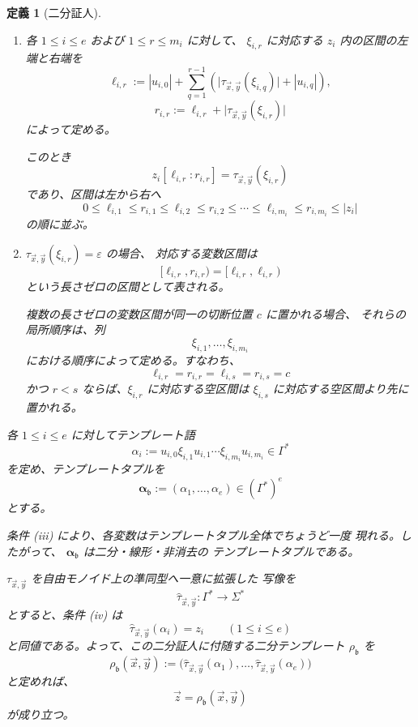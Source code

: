 \documentclass[11pt,a4paper]{ltjsarticle}
\newtheorem{definition}[theorem]{定義}
\theoremstyle{remark}
\newcommand{\tuple}[1]{\vec{#1}}
\newcommand{\eps}{\varepsilon}
\begin{document}
\begin{definition}[二分証人]
\begin{enumerate}[label=(\roman*),leftmargin=*]
各 \(1\le i\le e\) について、次の等式が成り立つ。
\[
  z_i
  =
  u_{i,0}\,
  \tau_{\tuple x,\tuple y}(\xi_{i,1})\,
  u_{i,1}\cdots
  \tau_{\tuple x,\tuple y}(\xi_{i,m_i})\,
  u_{i,m_i}.
  \tag{\(*\)}
\]
したがって、式 \textup{(\(*\))} は親成分 \(z_i\) を、終端語からなる
隙間と、子タプルの成分を値にもつ変数区間とに分解する。

\item
各 \(1\le i\le e\) および \(1\le r\le m_i\) に対して、
\(\xi_{i,r}\) に対応する \(z_i\) 内の区間の左端と右端を
\[
  \ell_{i,r}
  :=
  |u_{i,0}|
  +
  \sum_{q=1}^{r-1}
  \left(
    \bigl|
      \tau_{\tuple x,\tuple y}(\xi_{i,q})
    \bigr|
    +
    |u_{i,q}|
  \right),
\]
\[
  r_{i,r}
  :=
  \ell_{i,r}
  +
  \bigl|
    \tau_{\tuple x,\tuple y}(\xi_{i,r})
  \bigr|
\]
によって定める。

このとき
\[
  z_i[\ell_{i,r}:r_{i,r}]
  =
  \tau_{\tuple x,\tuple y}(\xi_{i,r})
\]
であり、区間は左から右へ
\[
  0\le
  \ell_{i,1}\le r_{i,1}\le
  \ell_{i,2}\le r_{i,2}\le
  \cdots\le
  \ell_{i,m_i}\le r_{i,m_i}\le |z_i|
\]
の順に並ぶ。

\item
\(\tau_{\tuple x,\tuple y}(\xi_{i,r})=\eps\) の場合、
対応する変数区間は
\[
  [\ell_{i,r},r_{i,r})
  =
  [\ell_{i,r},\ell_{i,r})
\]
という長さゼロの区間として表される。

複数の長さゼロの変数区間が同一の切断位置 \(c\) に置かれる場合、
それらの局所順序は、列
\[
  \xi_{i,1},\ldots,\xi_{i,m_i}
\]
における順序によって定める。すなわち、
\[
  \ell_{i,r}=r_{i,r}
  =
  \ell_{i,s}=r_{i,s}=c
\]
かつ \(r<s\) ならば、\(\xi_{i,r}\) に対応する空区間は
\(\xi_{i,s}\) に対応する空区間より先に置かれる。

\end{enumerate}

各 \(1\le i\le e\) に対してテンプレート語
\[
  \alpha_i
  :=
  u_{i,0}\xi_{i,1}u_{i,1}
  \cdots
  \xi_{i,m_i}u_{i,m_i}
  \in\Gamma^*
\]
を定め、テンプレートタプルを
\[
  \boldsymbol{\alpha}_{\mathfrak b}
  :=
  (\alpha_1,\ldots,\alpha_e)
  \in(\Gamma^*)^e
\]
とする。

条件 (iii) により、各変数はテンプレートタプル全体でちょうど一度
現れる。したがって、
\(\boldsymbol{\alpha}_{\mathfrak b}\) は二分・線形・非消去の
テンプレートタプルである。

\(\tau_{\tuple x,\tuple y}\) を自由モノイド上の準同型へ一意に拡張した
写像を
\[
  \widehat{\tau}_{\tuple x,\tuple y}
  \colon\Gamma^*\to\Sigma^*
\]
とすると、条件 (iv) は
\[
  \widehat{\tau}_{\tuple x,\tuple y}(\alpha_i)=z_i
  \qquad (1\le i\le e)
\]
と同値である。よって、この二分証人に付随する二分テンプレート
\(\rho_{\mathfrak b}\) を
\[
  \rho_{\mathfrak b}(\tuple x,\tuple y)
  :=
  \bigl(
    \widehat{\tau}_{\tuple x,\tuple y}(\alpha_1),
    \ldots,
    \widehat{\tau}_{\tuple x,\tuple y}(\alpha_e)
  \bigr)
\]
と定めれば、
\[
  \tuple z
  =
  \rho_{\mathfrak b}(\tuple x,\tuple y)
\]
が成り立つ。
\end{definition}
\end{document}
